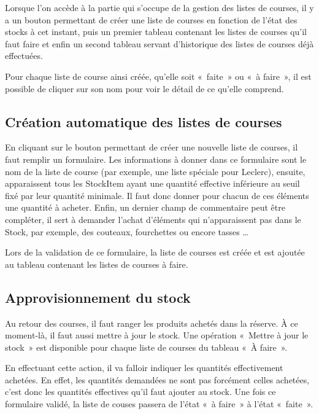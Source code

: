 \documentclass[a4paper]{report}
\begin{document}
\par Lorsque l’on accède à la partie qui s’occupe de la gestion des listes de courses, il y a un bouton permettant de créer une liste de courses en fonction de l’état des stocks à cet instant, puis un premier tableau contenant les listes de courses qu’il faut faire et enfin un second tableau servant d’historique des listes de courses déjà effectuées.
\par Pour chaque liste de course ainsi créée, qu’elle soit « faite » ou « à faire », il est possible de cliquer sur son nom pour voir le détail de ce qu’elle comprend.

\subsection{Création automatique des listes de courses}
\par En cliquant sur le bouton permettant de créer une nouvelle liste de courses, il faut remplir un formulaire. Les informations à donner dans ce formulaire sont le nom de la liste de course (par exemple, une liste spéciale pour Leclerc), ensuite, apparaissent tous les StockItem ayant une quantité effective inférieure au seuil fixé par leur quantité minimale. Il faut donc donner pour chacun de ces éléments une quantité à acheter. Enfin, un dernier champ de commentaire peut être compléter, il sert à demander l’achat d’éléments qui n’apparaissent pas dans le Stock, par exemple, des couteaux, fourchettes ou encore tasses …
\par Lors de la validation de ce formulaire, la liste de courses est créée et est ajoutée au tableau contenant les listes de courses à faire.

\subsection{Approvisionnement du stock}
\par Au retour des courses, il faut ranger les produits achetés dans la réserve. À ce moment-là, il faut aussi mettre à jour le stock. Une opération « Mettre à jour le stock » est disponible pour chaque liste de courses du tableau « À faire ».
\par En effectuant cette action, il va falloir indiquer les quantités effectivement achetées. En effet, les quantités demandées ne sont pas forcément celles achetées, c’est donc les quantités effectives qu’il faut ajouter au stock. Une fois ce formulaire validé, la liste de couses passera de l’état « à faire » à l’état « faite ».
\end{document}
